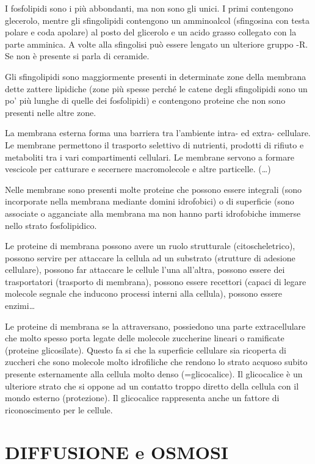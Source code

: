 \documentclass[]{article}
\begin{document}
I fosfolipidi sono i più abbondanti, ma non sono gli unici. I primi
contengono glecerolo, mentre gli sfingolipidi contengono un amminoalcol
(sfingosina con testa polare e coda apolare) al posto del glicerolo e un
acido grasso collegato con la parte amminica. A volte alla sfingolisi
può essere lengato un ulteriore gruppo -R. Se non è presente si parla di
ceramide.

Gli sfingolipidi sono maggiormente presenti in determinate zone della
membrana dette zattere lipidiche (zone più spesse perché le catene degli
sfingolipidi sono un po' più lunghe di quelle dei fosfolipidi) e
contengono proteine che non sono presenti nelle altre zone.

La membrana esterna forma una barriera tra l'ambiente intra- ed extra-
cellulare. Le membrane permettono il trasporto selettivo di nutrienti,
prodotti di rifiuto e metaboliti tra i vari compartimenti cellulari. Le
membrane servono a formare vescicole per catturare e secernere
macromolecole e altre particelle. (\ldots{})

Nelle membrane sono presenti molte proteine che possono essere integrali
(sono incorporate nella membrana mediante domini idrofobici) o di
superficie (sono associate o agganciate alla membrana ma non hanno parti
idrofobiche immerse nello strato fosfolipidico.

Le proteine di membrana possono avere un ruolo strutturale
(citoscheletrico), possono servire per attaccare la cellula ad un
substrato (strutture di adesione cellulare), possono far attaccare le
cellule l'una all'altra, possono essere dei trasportatori (trasporto di
membrana), possono essere recettori (capaci di legare molecole segnale
che inducono processi interni alla cellula), possono essere
enzimi\ldots{}

Le proteine di membrana se la attraversano, possiedono una parte
extracellulare che molto spesso porta legate delle molecole zuccherine
lineari o ramificate (proteine glicosilate). Questo fa si che la
superficie cellulare sia ricoperta di zuccheri che sono molecole molto
idrofiliche che rendono lo strato acquoso subito presente esternamente
alla cellula molto denso (=glicocalice). Il glicocalice è un ulteriore
strato che si oppone ad un contatto troppo diretto della cellula con il
mondo esterno (protezione). Il glicocalice rappresenta anche un fattore
di riconoscimento per le cellule.

\section{DIFFUSIONE e OSMOSI}\label{diffusione-e-osmosi}
\end{document}
